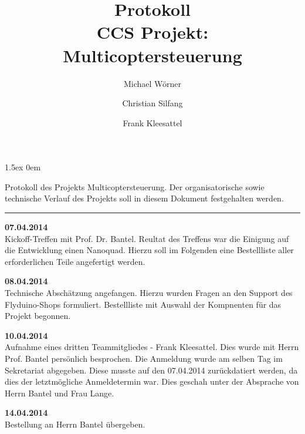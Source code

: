 \documentclass[a4paper,12pt]{article}
\begin{document}
\title{
\textbf{Protokoll}\\
CCS Projekt: Multicoptersteuerung}
\author{Michael Wörner \and Christian Silfang \and Frank Kleesattel}
\date{}

\parskip1.5ex
\parindent0em

\maketitle

Protokoll des Projekts \glqq Multicoptersteuerung\grqq. Der organisatorische sowie technische Verlauf des Projekts soll in diesem Dokument festgehalten werden.

\noindent\rule[1ex]{\textwidth}{1pt}
\vspace{1cm}

\textbf{07.04.2014}\\
Kickoff-Treffen mit Prof. Dr. Bantel. Reultat des Treffens war die Einigung auf die Entwicklung einen Nanoquad. Hierzu soll im Folgenden eine Bestellliste aller erforderlichen Teile angefertigt werden.

\textbf{08.04.2014}\\
Technische Abschätzung angefangen. Hierzu wurden Fragen an den Support des Flyduino-Shops formuliert.
Bestellliste mit Auswahl der Kompnenten für das Projekt begonnen.

\textbf{10.04.2014}\\
Aufnahme eines dritten Teammitgliedes - Frank Kleesattel. Dies wurde mit Herrn Prof. Bantel
persönlich besprochen. Die Anmeldung wurde am selben Tag im Sekretariat abgegeben. Diese musste 
auf den 07.04.2014 zurückdatiert werden, da dies der letztmögliche Anmeldetermin war. Dies geschah
unter der Absprache von Herrn Bantel und Frau Lange.

\textbf{14.04.2014}\\
Bestellung an Herrn Bantel übergeben.
\end{document}

